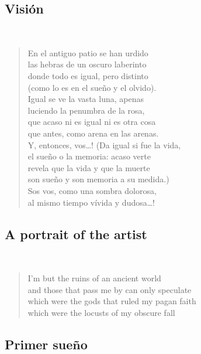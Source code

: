 \documentclass[a4paper, 12pt]{article}
\begin{document}
\pagebreak
\subsection{Visión}
~ 

\begin{verse}
    
En el antiguo patio se han urdido\\
las hebras de un oscuro laberinto\\
donde todo es igual, pero distinto\\
(como lo es en el sueño y el olvido).\\
Igual se ve la vasta luna, apenas\\
luciendo la penumbra de la rosa,\\
que acaso ni es igual ni es otra cosa\\
que antes, como arena en las arenas.\\
Y, entonces, vos\ldots! (Da igual si fue la vida,\\
el sueño o la memoria: acaso verte\\
revela que la vida y que la muerte\\
son sueño y son memoria a su medida.)\\
Sos vos, como una sombra dolorosa,\\
al mismo tiempo vívida y dudosa…!\\
\end{verse}

\pagebreak
\subsection{A portrait of the artist}
~ 

\begin{verse}
I'm but the ruins of an ancient world\\
and those that pass me by can only speculate\\
which were the gods that ruled my pagan faith\\
which were the locusts of my obscure fall\\
\end{verse}

\pagebreak 
\subsection{Primer sueño}
~ 
\end{document}
